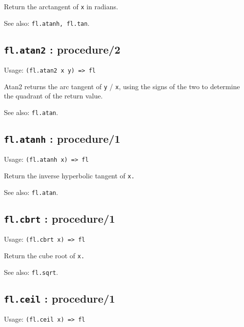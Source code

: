 \documentclass[
]{article}
\newcommand{\passthrough}[1]{#1}
\begin{document}
Return the arctangent of \passthrough{\lstinline!x!} in radians.

See also: \passthrough{\lstinline!fl.atanh, fl.tan!}.

\hypertarget{fl.atan2-procedure2-1}{%
\subsection{\texorpdfstring{\texttt{fl.atan2} :
procedure/2}{fl.atan2 : procedure/2}}\label{fl.atan2-procedure2-1}}

Usage: \passthrough{\lstinline!(fl.atan2 x y) => fl!}

Atan2 returns the arc tangent of \passthrough{\lstinline!y!} /
\passthrough{\lstinline!x!}, using the signs of the two to determine the
quadrant of the return value.

See also: \passthrough{\lstinline!fl.atan!}.

\hypertarget{fl.atanh-procedure1-1}{%
\subsection{\texorpdfstring{\texttt{fl.atanh} :
procedure/1}{fl.atanh : procedure/1}}\label{fl.atanh-procedure1-1}}

Usage: \passthrough{\lstinline!(fl.atanh x) => fl!}

Return the inverse hyperbolic tangent of \passthrough{\lstinline!x.!}

See also: \passthrough{\lstinline!fl.atan!}.

\hypertarget{fl.cbrt-procedure1-1}{%
\subsection{\texorpdfstring{\texttt{fl.cbrt} :
procedure/1}{fl.cbrt : procedure/1}}\label{fl.cbrt-procedure1-1}}

Usage: \passthrough{\lstinline!(fl.cbrt x) => fl!}

Return the cube root of \passthrough{\lstinline!x.!}

See also: \passthrough{\lstinline!fl.sqrt!}.

\hypertarget{fl.ceil-procedure1-1}{%
\subsection{\texorpdfstring{\texttt{fl.ceil} :
procedure/1}{fl.ceil : procedure/1}}\label{fl.ceil-procedure1-1}}

Usage: \passthrough{\lstinline!(fl.ceil x) => fl!}
\end{document}
